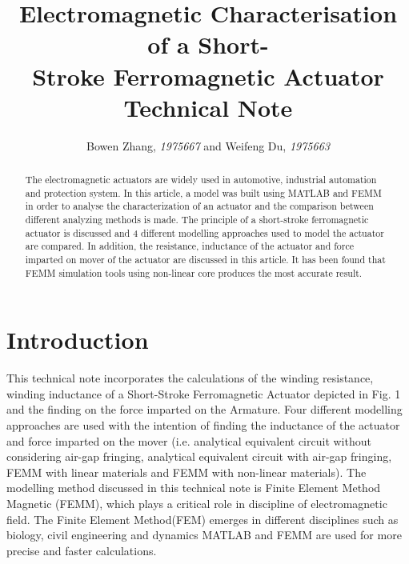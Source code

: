 \documentclass[a4paper]{IEEEtran}
\begin{document}
%
\title{Electromagnetic Characterisation of a Short-\\ Stroke Ferromagnetic Actuator Technical Note\vspace{-.1em}}

\author{Bowen Zhang, \textit{1975667}
	and Weifeng Du, \textit{1975663}
\vspace{-.45em}
}

\maketitle

\thispagestyle{empty}
\begin{abstract}
The electromagnetic actuators are widely used in automotive, industrial automation and protection system\cite{applications}. 
In this article, a model was built using MATLAB and FEMM in order to 
analyse the characterization of an actuator and the comparison between different analyzing methods is made. 
The principle of a short-stroke ferromagnetic actuator is discussed 
and 4 different modelling approaches used to model the actuator are compared. In addition, the resistance, inductance of the actuator and force imparted on mover of the actuator are discussed in this article.
It has been found that FEMM simulation tools using non-linear core produces the most 
accurate result.
\end{abstract}

\vspace{1em}



\section{Introduction}
This technical note incorporates the calculations of the winding resistance, winding inductance 
of a Short-Stroke Ferromagnetic Actuator depicted in Fig. 1 and the finding on 
the force imparted on the Armature. Four different modelling 
approaches are used with the intention of finding the inductance of the actuator and force imparted on the mover
(i.e. analytical equivalent circuit without considering air-gap 
fringing, analytical equivalent circuit with air-gap fringing, 
FEMM with linear materials and FEMM with non-linear materials\cite{notes_b}). 
The modelling method discussed in this technical note is Finite Element 
Method Magnetic (FEMM), which plays a critical role in discipline of electromagnetic field.
The Finite Element Method(FEM) emerges in different disciplines such as biology\cite{biology_application}, civil engineering\cite{civil_application} and dynamics\cite{dynamics_application}
MATLAB and FEMM are used for more precise and faster calculations.
\end{document}
